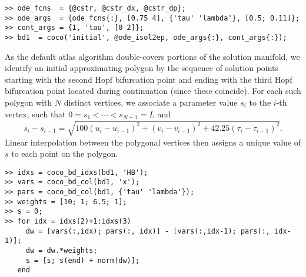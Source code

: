 \begin{lstlisting}[language=coco-highlight]
>> ode_fcns  = {@cstr, @cstr_dx, @cstr_dp};
>> ode_args  = {ode_fcns{:}, [0.75 4], {'tau' 'lambda'}, [0.5; 0.11]};
>> cont_args = {1, 'tau', [0 2]};
>> bd1  = coco('initial', @ode_isol2ep, ode_args{:}, cont_args{:});
\end{lstlisting}
As the default atlas algorithm double-covers portions of the solution manifold, we identify an initial approximating polygon by the sequence of solution points starting with the second Hopf bifurcation point and ending with the third Hopf bifurcation point located during continuation (since these coincide). For each such polygon with $N$ distinct vertices, we associate a parameter value $s_i$ to the $i$-th vertex, such that $0=s_1<\cdots<s_{N+1}=L$ and
\begin{equation}
s_i-s_{i-1}=\sqrt{100(u_i-u_{i-1})^2+(v_i-v_{i-1})^2+42.25(\tau_i-\tau_{i-1})^2}.
\label{eq: wdist}
\end{equation}
Linear interpolation between the polygonal vertices then assigns a unique value of $s$ to each point on the polygon.
\begin{lstlisting}[language=coco-highlight]
>> idxs = coco_bd_idxs(bd1, 'HB');
>> vars = coco_bd_col(bd1, 'x');
>> pars = coco_bd_col(bd1, {'tau' 'lambda'});
>> weights = [10; 1; 6.5; 1];
>> s = 0;
>> for idx = idxs(2)+1:idxs(3)
     dw = [vars(:,idx); pars(:, idx)] - [vars(:,idx-1); pars(:, idx-1)];
     dw = dw.*weights;
     s = [s; s(end) + norm(dw)];
   end
\end{lstlisting}

